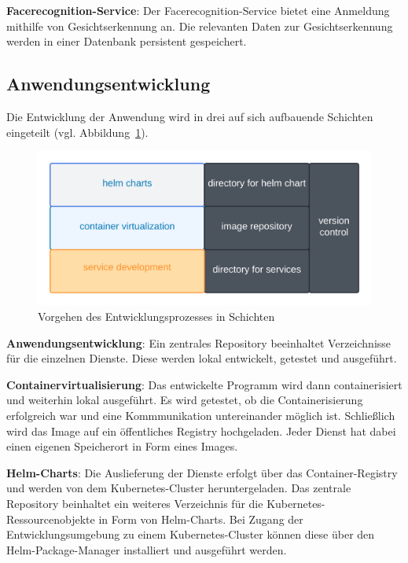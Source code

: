 \textbf{Facerecognition-Service}: Der Facerecognition-Service bietet eine Anmeldung mithilfe von Gesichtserkennung an.
Die relevanten Daten zur Gesichtserkennung werden in einer Datenbank persistent gespeichert.

\subsection{Anwendungsentwicklung}
Die Entwicklung der Anwendung wird in drei auf sich aufbauende Schichten eingeteilt (vgl. Abbildung~\ref{fig:Schichtenentwurf}).

\begin{figure}[!htb]
    \centering
    \includegraphics[width=1.0\columnwidth]{images/Schichtenentwurf.png}
    \caption{Vorgehen des Entwicklungsprozesses in Schichten}
    \label{fig:Schichtenentwurf}
  \end{figure}

\textbf{Anwendungsentwicklung}: 
Ein zentrales Repository beeinhaltet Verzeichnisse für die einzelnen Dienste.
Diese werden lokal entwickelt, getestet und ausgeführt.

\textbf{Containervirtualisierung}: 
Das entwickelte Programm wird dann containerisiert und weiterhin lokal ausgeführt.
Es wird getestet, ob die Containerisierung erfolgreich war und eine Kommmunikation untereinander möglich ist. 
Schließlich wird das Image auf ein öffentliches Registry hochgeladen. 
Jeder Dienst hat dabei einen eigenen Speicherort in Form eines Images.

\textbf{Helm-Charts}: 
Die Auslieferung der Dienste erfolgt über das Container-Registry und werden von dem Kubernetes-Cluster heruntergeladen.
Das zentrale Repository beinhaltet ein weiteres Verzeichnis für die Kubernetes-Ressourcenobjekte in Form von Helm-Charts.
Bei Zugang der Entwicklungsumgebung zu einem Kubernetes-Cluster können diese über den Helm-Package-Manager installiert und ausgeführt werden.



